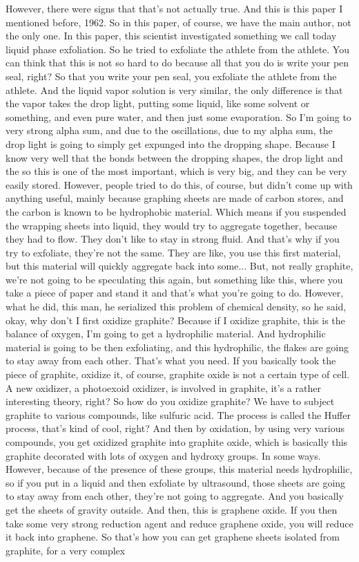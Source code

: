 However, there were signs that that's not actually true. And this is this paper I mentioned before, 1962. So in this paper, of course, we have the main author, not the only one. In this paper, this scientist investigated something we call today liquid phase exfoliation. So he tried to exfoliate the athlete from the athlete. You can think that this is not so hard to do because all that you do is write your pen seal, right? So that you write your pen seal, you exfoliate the athlete from the athlete. And the liquid vapor solution is very similar, the only difference is that the vapor takes the drop light, putting some liquid, like some solvent or something, and even pure water, and then just some evaporation. So I'm going to very strong alpha sum, and due to the oscillations, due to my alpha sum, the drop light is going to simply get expunged into the dropping shape. Because I know very well that the bonds between the dropping shapes, the drop light and the so this is one of the most important, which is very big, and they can be very easily stored. However, people tried to do this, of course, but didn't come up with anything useful, mainly because graphing sheets are made of carbon stores, and the carbon is known to be hydrophobic material. Which means if you suspended the wrapping sheets into liquid, they would try to aggregate together, because they had to flow. They don't like to stay in strong fluid. And that's why if you try to exfoliate, they're not the same. They are like, you use this first material, but this material will quickly aggregate back into some... But, not really graphite, we're not going to be speculating this again, but something like this, where you take a piece of paper and stand it and that's what you're going to do. However, what he did, this man, he serialized this problem of chemical density, so he said, okay, why don't I first oxidize graphite? Because if I oxidize graphite, this is the balance of oxygen, I'm going to get a hydrophilic material. And hydrophilic material is going to be then exfoliating, and this hydrophilic, the flakes are going to stay away from each other. That's what you need. If you basically took the piece of graphite, oxidize it, of course, graphite oxide is not a certain type of cell. A new oxidizer, a photoexoid oxidizer, is involved in graphite, it's a rather interesting theory, right? So how do you oxidize graphite? We have to subject graphite to various compounds, like sulfuric acid. The process is called the Huffer process, that's kind of cool, right? And then by oxidation, by using very various compounds, you get oxidized graphite into graphite oxide, which is basically this graphite decorated with lots of oxygen and hydroxy groups. In some ways. However, because of the presence of these groups, this material needs hydrophilic, so if you put in a liquid and then exfoliate by ultrasound, those sheets are going to stay away from each other, they're not going to aggregate. And you basically get the sheets of gravity outside. And then, this is graphene oxide. If you then take some very strong reduction agent and reduce graphene oxide, you will reduce it back into graphene. So that's how you can get graphene sheets isolated from graphite, for a very complex 